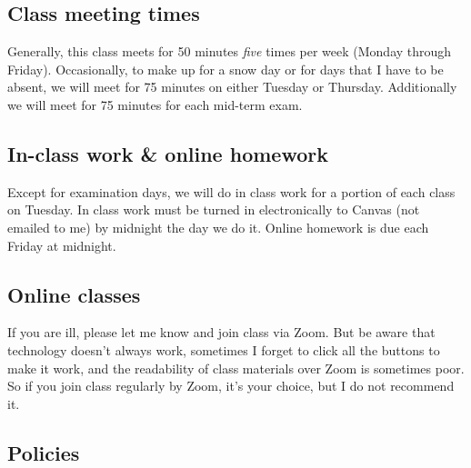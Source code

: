 \documentclass[12pt]{article}
\newcounter{ex}\setcounter{ex}{0}
\begin{document}
\subsection*{Class meeting times}

Generally, this  class meets for 50 minutes \emph{five} times per week 
(Monday through Friday). Occasionally, to make up for a snow day or for days that I have to 
be absent,  we will meet for 75 minutes on either Tuesday or Thursday.
 Additionally we will meet for 75 minutes for each mid-term exam. 



\subsection*{In-class work \& online homework}

Except for examination days, we will do in class work for a portion 
of each class on Tuesday. In class work must be turned in 
electronically to Canvas (not emailed to me) by midnight the day we 
do it. Online homework is due each Friday at midnight. 

\subsection*{Online classes}

If you are ill, please let me know and join class via Zoom. But 
be aware that technology doesn't always work, sometimes I forget to 
click all the buttons to make it work, and the readability of class 
materials over Zoom is sometimes poor. So if you join class regularly 
by Zoom, it's your choice, but I do not recommend it. 

\subsection* {Policies}
\end{document}
